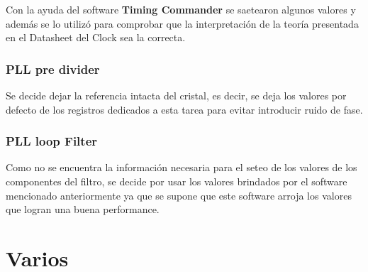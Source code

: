 \documentclass[a4paper,12pt]{report} %
\begin{document}
Con la ayuda del software \textbf{Timing Commander} se saetearon algunos valores y además se lo utilizó para comprobar que la interpretación de la teoría presentada en el Datasheet del Clock sea la correcta.

\subsection{PLL pre divider}

Se decide dejar la referencia intacta del cristal, es decir, se deja los valores por defecto de los registros dedicados a esta tarea para evitar introducir ruido de fase.

\subsection{PLL loop Filter}

Como no se encuentra la información necesaria para el seteo de los valores de los componentes del filtro, se decide por usar los valores brindados por el software mencionado anteriormente ya que se supone que este software arroja los valores que logran una buena performance.



\chapter*{Varios}
\end{document}
